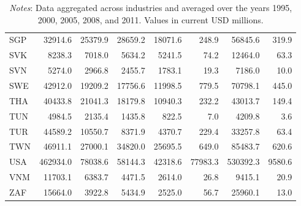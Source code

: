 \documentclass[a4paper,11pt]{article}
\begin{document}
\begin{table}[h]
\begin{tabular}{lrrrrrrr}
    SGP   & 32914.6 & 25379.9 & 28659.2 & 18071.6 & 248.9 & 56845.6 & 319.9 \\
    SVK   & 8238.3 & 7018.0 & 5634.2 & 5241.5 & 74.2  & 12464.0 & 63.3 \\
    SVN   & 5274.0 & 2966.8 & 2455.7 & 1783.1 & 19.3  & 7186.0 & 10.0 \\
    SWE   & 42912.0 & 19209.2 & 17756.6 & 11998.5 & 779.5 & 70798.1 & 445.0 \\
    THA   & 40433.8 & 21041.3 & 18179.8 & 10940.3 & 232.2 & 43013.7 & 149.4 \\
    TUN   & 4984.5 & 2135.4 & 1435.8 & 822.5 & 7.0   & 4209.8 & 3.6 \\
    TUR   & 44589.2 & 10550.7 & 8371.9 & 4370.7 & 229.4 & 33257.8 & 63.4 \\
    TWN   & 46911.1 & 27000.1 & 34820.0 & 25695.5 & 649.0 & 85483.7 & 620.6 \\
    USA   & 462934.0 & 78038.6 & 58144.3 & 42318.6 & 77983.3 & 530392.3 & 9580.6 \\
    VNM   & 11703.1 & 6383.7 & 4471.5 & 2614.0 & 26.8  & 9415.1 & 20.9 \\
    ZAF   & 15664.0 & 3922.8 & 5434.9 & 2525.0 & 56.7  & 25960.1 & 13.0 \\
    \bottomrule
\end{tabular}
          \caption*{\textit{Notes}: Data aggregated across industries and averaged over the years 1995, 2000, 2005, 2008, and 2011. Values in current USD millions.}
\end{table}
\end{document}
